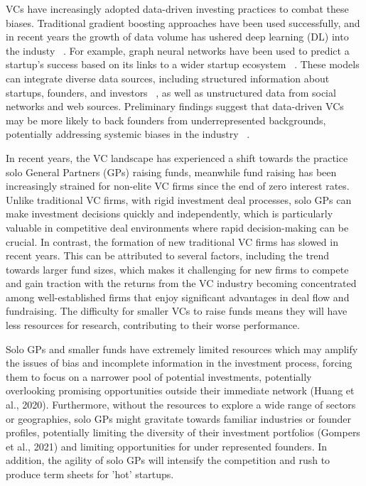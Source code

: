 \documentclass[a4paper, oneside]{discothesis}
\begin{document}
VCs have increasingly adopted data-driven investing practices to combat these biases. 
Traditional gradient boosting approaches have been used successfully, and in recent years the growth of data volume has ushered deep learning (DL) into the industy ~\cite{eqt}.
For example, graph neural networks have been used to predict a startup's success based on its links to a wider startup ecosystem ~\cite{korea}. 
These models can integrate diverse data sources, including structured information about startups, founders, and investors ~\cite{corea}, as well as unstructured data from social networks and web sources. 
Preliminary findings suggest that data-driven VCs may be more likely to back founders from underrepresented backgrounds, potentially addressing systemic biases in the industry ~\cite{futureVC}.

In recent years, the VC landscape has experienced a shift towards the practice solo General Partners (GPs)  raising funds, meanwhile fund raising has been increasingly strained for non-elite VC firms since the end of zero interest rates. Unlike traditional VC firms, with rigid investment deal processes, solo GPs can make investment decisions quickly and independently, which is particularly valuable in competitive deal environments where rapid decision-making can be crucial.
In contrast, the formation of new traditional VC firms has slowed in recent years. This can be attributed to several factors, including the trend towards larger fund sizes, which makes it challenging for new firms to compete and gain traction with the returns from the VC industry becoming concentrated among well-established firms that enjoy significant advantages in deal flow and fundraising. 
The difficulty for smaller VCs to raise funds means they will have less resources for research, contributing to their worse performance.

Solo GPs and smaller funds have extremely limited resources which may amplify the issues of bias and incomplete information in the investment process, forcing them to  focus on a narrower pool of potential investments, potentially overlooking promising opportunities outside their immediate network (Huang et al., 2020). Furthermore, without the resources to explore a wide range of sectors or geographies, solo GPs might gravitate towards familiar industries or founder profiles, potentially limiting the diversity of their investment portfolios (Gompers et al., 2021) and limiting opportunities for under represented founders. In addition, the agility of solo GPs will intensify the competition and rush to produce term sheets for 'hot' startups. 
\end{document}
